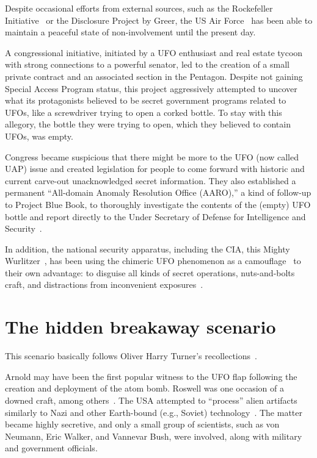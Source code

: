 Despite occasional efforts from external sources, such as the Rockefeller Initiative~\cite{Berliner2000Jun} or the Disclosure Project by Greer,
the US Air Force~\cite{Greer-dp} has been able to maintain a peaceful state of non-involvement until the present day.

A congressional initiative, initiated by a UFO enthusiast and real estate tycoon with strong connections to a powerful senator,
led to the creation of a small private contract and an associated section in the Pentagon.
Despite not gaining Special Access Program status, this project aggressively attempted
to uncover what its protagonists believed to be secret government programs related to UFOs,
like a screwdriver trying to open a corked bottle.
To stay with this allegory, the bottle they were trying to open, which they believed to contain UFOs, was empty.

Congress became suspicious that there might be more to the UFO (now called UAP) issue and created legislation for people to come forward with historic and current carve-out unacknowledged secret information. They also established a permanent ``All-domain Anomaly Resolution Office (AARO),'' a kind of follow-up to Project Blue Book, to thoroughly investigate the contents of the (empty) UFO bottle and report directly to the Under Secretary of Defense for Intelligence and Security~\cite{AARO22}.

In addition, the national security apparatus, including the CIA, this
Mighty Wurlitzer~\cite{Loory1974,Bernstein1977,Wilford2009,Covert2016}, has been
using the chimeric UFO phenomenon as a camouflage~\cite{SnowdenTweet2023Feb}
to their own advantage:
to disguise all kinds of secret operations, nuts-and-bolts craft, and distractions from inconvenient exposures~\cite{HershsubstackFeb3,Hersh2023Feb}.


\section{The hidden breakaway scenario}
\label{2023-UFO-part-Speculation-executive-summary-hb} %

This scenario basically follows Oliver Harry Turner's recollections~\cite{TurnerAustralia1971}.

Arnold may have been the first popular witness to the UFO flap following the creation and deployment of the atom bomb.
Roswell was one occasion of a downed craft, among others~\cite{Vallee2021May}.
The USA attempted to ``process'' alien artifacts similarly to Nazi and other Earth-bound (e.g., Soviet)
technology~\cite{SmithWilbertNotes, Sarbacher-83}. The matter became highly secretive, and only a small group of scientists,
such as von Neumann, Eric Walker, and Vannevar Bush, were involved, along with military and government officials.

